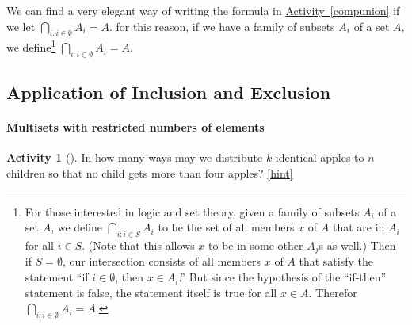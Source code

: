 \documentclass[10pt,]{book}
\theoremstyle{plain}
\theoremstyle{definition}
\theoremstyle{definition}
\theoremstyle{definition}
\newtheorem{activity}[project]{Activity}
\numberwithin{equation}{chapter}
\begin{document}
\hypertarget{p-1204}{}%
We can find a very elegant way of writing the formula in \hyperref[compunion]{Activity~\ref{compunion}} if we let \(\bigcap_{i:i\in\emptyset}A_i = A\).  for this reason, if we have a family of subsets \(A_i\) of a set \(A\), we define\footnote{For those interested in logic and set theory, given a family of subsets \(A_i\) of a set \(A\), we define \(\bigcap_{i:i\in S}A_i\) to be the set of all members \(x\) of \(A\) that are in \(A_i\) for all \(i \in S\).  (Note that this allows \(x\) to be in some other \(A_j\)s as well.)  Then if \(S = \emptyset\), our intersection consists of all members \(x\) of \(A\) that satisfy the statement ``if \(i\in \emptyset\), then \(x \in A_i\).'' But since the hypothesis of the ``if-then'' statement is false, the statement itself is true for all \(x \in A\).  Therefor \(\bigcap_{i:i \in \emptyset}A_i = A\).\label{fn-12}} \(\bigcap_{i:i\in\emptyset}A_i = A\).%
\typeout{************************************************}
\typeout{************************************************}
\subsection[{Application of Inclusion and Exclusion}]{Application of Inclusion and Exclusion}\label{subsection-29}
\typeout{************************************************}
\typeout{************************************************}
\paragraph[{Multisets with restricted numbers of elements}]{Multisets with restricted numbers of elements}\hypertarget{paragraphs-4}{}
\begin{activity}[]\label{act_restrictedmultisetspie}
\hypertarget{p-1205}{}%
In how many ways may we distribute \(k\) identical apples to \(n\) children so that no child gets more than four apples?%
\hfill{\tiny\hyperlink{a-225}{[hint]}\hypertarget{q-225}{}}\end{activity}
\typeout{************************************************}
\typeout{************************************************}
\end{document}
